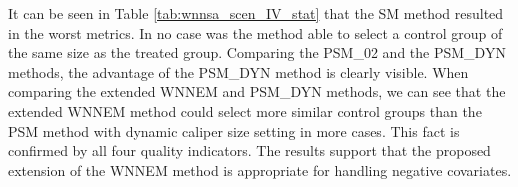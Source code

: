		\begin{table}[h]
			\caption{Quality measures for Scenario IV. %
			}
			\label{tab:wnnsa_scen_IV_stat}
			\centering
																	
		\end{table}
										
		It can be seen in Table \ref{tab:wnnsa_scen_IV_stat} that the SM method resulted in the worst metrics. In no case was the method able to select a control group of the same size as the treated group. Comparing the PSM\_02 and the PSM\_DYN methods, the advantage of the PSM\_DYN method is clearly visible. When comparing the extended WNNEM and PSM\_DYN methods, we can see that the extended WNNEM method could select more similar control groups than the PSM method with dynamic caliper size setting in more cases. This fact is confirmed by all four quality indicators. The results support that the proposed extension of the WNNEM method is appropriate for handling negative covariates.  
										

